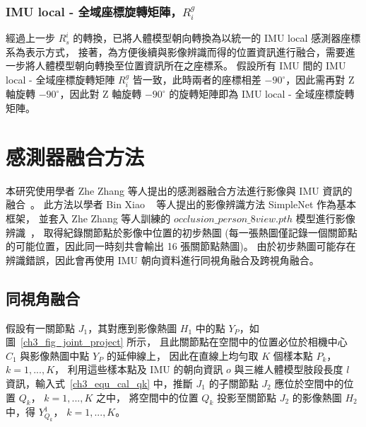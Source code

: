 \subsubsection{IMU local - 全域座標旋轉矩陣，$R^g_i$}
經過上一步 $R^i_s$ 的轉換，已將人體模型朝向轉換為以統一的 IMU local 感測器座標系為表示方式，
接著，為方便後續與影像辨識而得的位置資訊進行融合，需要進一步將人體模型朝向轉換至位置資訊所在之座標系。
假設所有 IMU 間的 IMU local - 全域座標旋轉矩陣 $R^g_i$ 皆一致，此時兩者的座標相差 $-90^{\circ}$，因此需再對 Z 軸旋轉 $-90^{\circ}$，因此對 Z 軸旋轉 $-90^{\circ}$ 的旋轉矩陣即為 IMU local - 全域座標旋轉矩陣。

\section{感測器融合方法}
本研究使用學者 Zhe Zhang 等人提出的感測器融合方法進行影像與 IMU 資訊的融合~\cite{Zhang_2020_CVPR}。
此方法以學者 Bin Xiao ~\cite{Xiao_2018_ECCV} 等人提出的影像辨識方法 SimpleNet 作為基本框架，
並套入 Zhe Zhang 等人訓練的 $occlusion\_person\_8view.pth$ 模型進行影像辨識~\cite{zhang2020adafuse}，
取得紀錄關節點於影像中位置的初步熱圖 (每一張熱圖僅記錄一個關節點的可能位置，因此同一時刻共會輸出 16 張關節點熱圖)。
由於初步熱圖可能存在辨識錯誤，因此會再使用 IMU 朝向資料進行同視角融合及跨視角融合。

\subsection{同視角融合}
假設有一關節點 $J_1$，其對應到影像熱圖 $H_1$ 中的點 $Y_P$，如圖~\ref{ch3_fig_joint_project} 所示，
且此關節點在空間中的位置必位於相機中心 $C_1$ 與影像熱圖中點 $Y_P$ 的延伸線上，
因此在直線上均勻取 $K$ 個樣本點 $P_k$， $k = 1, ..., K$，
利用這些樣本點及 IMU 的朝向資訊 $o$ 與三維人體模型肢段長度 $l$ 資訊，輸入式~\ref{ch3_equ_cal_qk} 中，推斷 $J_1$ 的子關節點 $J_2$ 應位於空間中的位置 $Q_k$， $k = 1, ..., K$ 之中，
將空間中的位置 $Q_k$ 投影至關節點 $J_2$ 的影像熱圖 $H_2$ 中，得 $Y^1_{Q_k}$， $k = 1, ..., K$。

